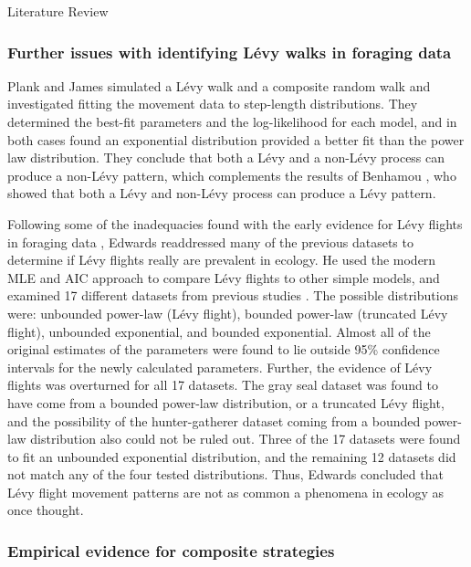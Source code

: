 \begin{section}{Literature Review \label{sec:litreview}}
\subsubsection{Further issues with identifying L\'{e}vy walks in foraging data}

Plank and James \cite{Plank_2008} simulated a L\'{e}vy walk and a composite random walk and investigated fitting the movement data to step-length distributions.
They determined the best-fit parameters and the log-likelihood for each model, and in both cases found an exponential distribution provided a better fit than the power law distribution.
They conclude that both a L\'{e}vy and a non-L\'{e}vy process can produce a non-L\'{e}vy pattern, which complements the results of Benhamou \cite{Benhamou_2007}, who showed that both a L\'{e}vy and non-L\'{e}vy process can produce a L\'{e}vy pattern.

Following some of the inadequacies found with the early evidence for L\'{e}vy flights in foraging data \cite{Edwards_2007}, Edwards \cite{Edwards_2011} readdressed many of the previous datasets to determine if L\'{e}vy flights really are prevalent in ecology.
He used the modern \ac{MLE} and \ac{AIC} approach \cite{Edwards_2007} to compare L\'{e}vy flights to other simple models, and examined 17 different datasets from previous studies \cite{Austin_2004,Marell_2002,Atkinson_2002,Brown_2006,Bertrand_2007,Marchal_2007,Bartumeus_2003}.
The possible distributions were: unbounded power-law (L\'{e}vy flight), bounded power-law (truncated L\'{e}vy flight), unbounded exponential, and bounded exponential.
Almost all of the original estimates of the parameters were found to lie outside 95\% confidence intervals for the newly calculated parameters.
Further, the evidence of L\'{e}vy flights was overturned for all 17 datasets.
The gray seal dataset was found to have come from a bounded power-law distribution, or a truncated L\'{e}vy flight, and the possibility of the hunter-gatherer dataset coming from a bounded power-law distribution also could not be ruled out.
Three of the 17 datasets were found to fit an unbounded exponential distribution, and the remaining 12 datasets did not match any of the four tested distributions.
Thus, Edwards concluded that L\'{e}vy flight movement patterns are not as common a phenomena in ecology as once thought.

\subsubsection{Empirical evidence for composite strategies}


\end{section}
